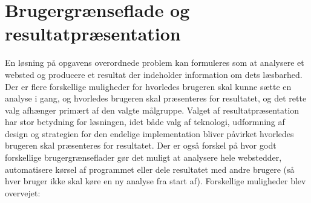 \documentclass[a4paper,oneside]{memoir}
\begin{document}
\section{Brugergrænseflade og resultatpræsentation}
\label{brugergraenseflade}
En løsning på opgavens overordnede problem kan formuleres som at
analysere et websted og producere et resultat der indeholder
information om dets læsbarhed. Der er flere forskellige muligheder for
hvorledes brugeren skal kunne sætte en analyse i gang, og hvorledes
brugeren skal præsenteres for resultatet, og det rette valg afhænger
primært af den valgte målgruppe. Valget af resultatpræsentation har
stor betydning for løsningen, idet både valg af teknologi, udformning
af design og strategien for den endelige implementation bliver
påvirket hvorledes brugeren skal præsenteres for resultatet. Der er
også forskel på hvor godt forskellige brugergrænseflader gør det
muligt at analysere hele webstedder, automatisere kørsel af programmet
eller dele resultatet med andre brugere (så hver bruger ikke skal køre
en ny analyse fra start af). Forskellige muligheder blev overvejet:
\end{document}
